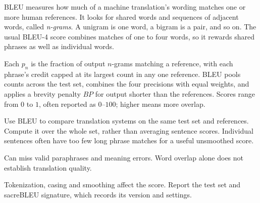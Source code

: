 BLEU measures how much of a machine translation's wording matches one or more human references.
It looks for shared words and sequences of adjacent words, called \textit{n-grams}. A unigram is one
word, a bigram is a pair, and so on. The usual BLEU-4 score combines matches of one to four words,
so it rewards shared phrases as well as individual words.

\begin{metricformula}
\end{metricformula}

Each $p_n$ is the fraction of output $n$-grams matching a reference, with each phrase's credit capped at its largest count in any one reference. BLEU pools counts across the test set, combines the four precisions with equal weights, and applies a brevity penalty $BP$ for output shorter than the references. Scores range from $0$ to $1$, often reported as $0$--$100$; higher means more overlap.


Use BLEU to compare translation systems on the same test set and references. Compute it over the
whole set, rather than averaging sentence scores. Individual sentences often have too few long
phrase matches for a useful unsmoothed score.


{
\item Can miss valid paraphrases and meaning errors. Word overlap alone does not establish translation quality.
\item Tokenization, casing and smoothing affect the score. Report the test set and sacreBLEU signature,
which records its version and settings.
}

